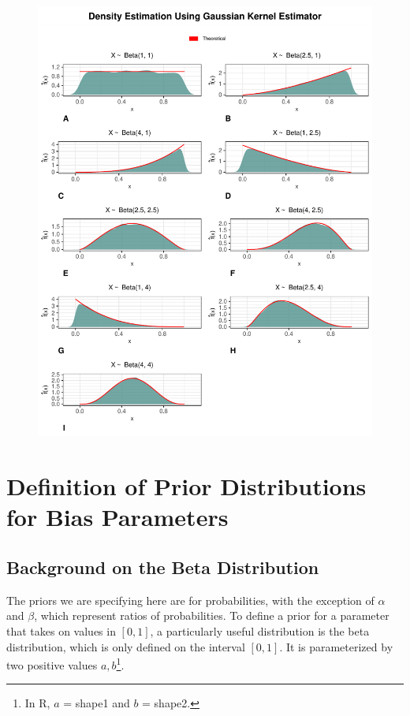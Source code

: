 \documentclass[12pt,twoside]{smiththesis}
\begin{document}
\begin{figure}

{\centering \includegraphics[width=1\linewidth]{thesis_files/figure-latex/unnamed-chunk-49-1} 

}

\caption{\label{fig:gaus}}\label{fig:unnamed-chunk-49}
\end{figure}
\hypertarget{defpriors}{%
\chapter{Definition of Prior Distributions for Bias Parameters}\label{defpriors}}

\hypertarget{background-on-the-beta-distribution}{%
\section{Background on the Beta Distribution}\label{background-on-the-beta-distribution}}

The priors we are specifying here are for probabilities, with the exception of \(\alpha\) and \(\beta\), which represent ratios of probabilities. To define a prior for a parameter that takes on values in \([0,1]\), a particularly useful distribution is the beta distribution, which is only defined on the interval \([0,1]\). It is parameterized by two positive values \(a, b\)\footnote{In R, \(a\) = shape1 and \(b\) = shape2.}.
\end{document}
